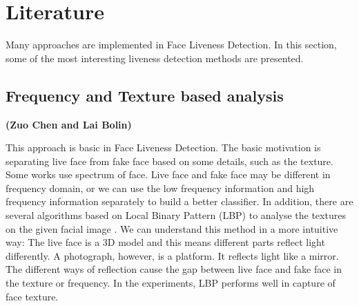 \documentclass[journal]{IEEEtran}
\begin{document}
%



\section{Literature}

Many approaches are implemented in Face Liveness Detection. In this section, some of the most interesting liveness detection methods are presented. 

\subsection{Frequency and Texture based analysis}

\textbf{(Zuo Chen and Lai Bolin)}

This approach is basic in Face Liveness Detection. The basic motivation is separating live face from fake face based on some details, such as the texture. Some works use spectrum of face. Live face and fake face may be different in frequency domain, or we can use the low frequency information and high frequency information separately to build a better classifier. In addition, there are several algorithms based on Local Binary Pattern (LBP) to analyse the textures on the given facial image \cite{chingovska2012effectiveness}\cite{maatta2011face}. We can understand this method in a more intuitive way: The live face is a 3D model and this means different parts reflect light differently. A photograph, however, is a platform. It reflects light like a mirror. The different ways of reflection cause the gap between live face and fake face in the texture or frequency. In the experiments, LBP performs well in capture of face texture.
\end{document}
